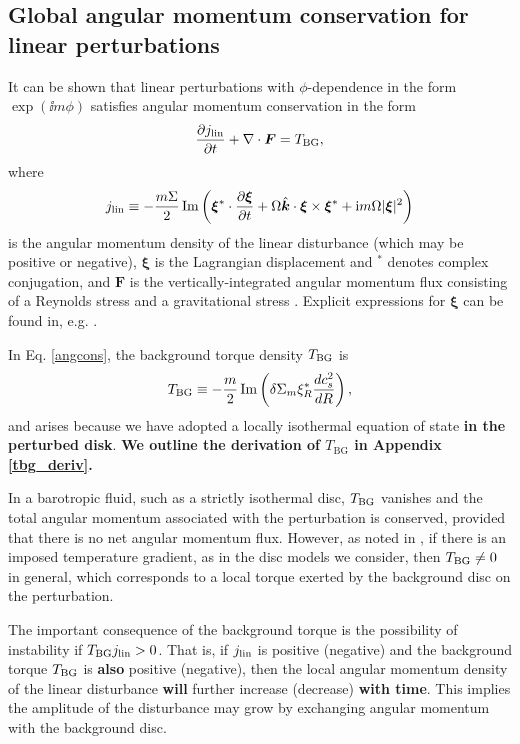 \subsection{Global angular momentum conservation for linear
  perturbations} \label{global_cons}
It can be shown that linear perturbations with $\phi$-dependence in the form
$\exp{(\ii m\phi)}$ satisfies angular momentum conservation
in the form 
\begin{align}\label{angcons}
  \frac{\partial j_\mathrm{lin}}{\partial t} + \nabla\cdot\bm{F} = T_\mathrm{BG}, 
\end{align}
\citep[e.g.][]{narayan87,ryu92,lin93b} where
\begin{align}\label{lin_ang_mom_cons}
  j_\mathrm{lin} \equiv
  -\frac{m\Sigma}{2}\operatorname{Im}\left(\bm{\xi}^*\cdot\frac{\partial\bm{\xi}}{\partial
      t} + \Omega \hat{\bm{k}}\cdot\bm{\xi}\times\bm{\xi}^* + \mathrm{i}
    m \Omega |\bm{\xi}|^2\right) 
\end{align}
is the angular momentum density of the linear disturbance (which may
be positive or negative), $\bm{\xi}$ is the Lagrangian
displacement and $^*$ denotes complex conjugation, and $\bm{F}$ is the
vertically-integrated angular momentum flux consisting of a Reynolds
stress and a gravitational stress \citep{lin11b}. Explicit expressions
for $\bm{\xi}$ can be found in, e.g. \cite{papaloizou85}. 

In Eq. \ref{angcons}, the background torque density $T_\mathrm{BG}$ is 
\begin{align}\label{baroclinic_torque}
  T_\mathrm{BG} \equiv
  -\frac{m}{2}\operatorname{Im}\left(\delta\Sigma_m\xi_R^*\frac{dc_s^2}{dR}\right), 
\end{align}
and arises because we have adopted a locally isothermal equation of
state {\bf in the perturbed disk}. {\bf  We outline the
derivation of $T_\mathrm{BG}$ in Appendix \ref{tbg_deriv}.} 

In a barotropic fluid, such as a strictly isothermal disc,
$T_\mathrm{BG}$ vanishes and the total angular momentum associated with
the perturbation is conserved, provided that there is no net angular
momentum flux. However, as noted in \cite{lin11b}, if there is an imposed
temperature gradient, as in the disc models we consider,
then $T_\mathrm{BG}\neq 0$ in general, which corresponds to a local torque
exerted by the background disc on the perturbation. 

The important consequence of the background torque is the possibility
of instability if $T_\mathrm{BG}j_\mathrm{lin}>0$. That is, if $j_\mathrm{lin}$ is positive
(negative) and the background torque $T_\mathrm{BG}$ is {\bf also} positive (negative),
then the local angular momentum density of the linear disturbance
{\bf will} further increase (decrease) {\bf with time}. This implies the amplitude of the disturbance
may grow by exchanging angular momentum with the background
disc.

